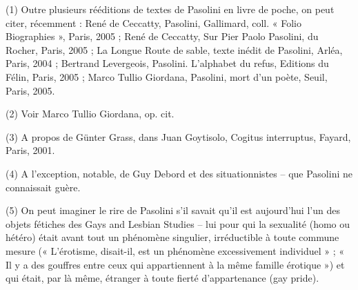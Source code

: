 \documentclass[a4paper,twocolumn]{article}
\begin{document}
(1) Outre plusieurs rééditions de textes de Pasolini en livre de poche, on peut citer, récemment : René de Ceccatty, Pasolini, Gallimard, coll. « Folio Biographies », Paris, 2005 ; René de Ceccatty, Sur Pier Paolo Pasolini, du Rocher, Paris, 2005 ; La Longue Route de sable, texte inédit de Pasolini, Arléa, Paris, 2004 ; Bertrand Levergeois, Pasolini. L’alphabet du refus, Editions du Félin, Paris, 2005 ; Marco Tullio Giordana, Pasolini, mort d’un poète, Seuil, Paris, 2005.

(2) Voir Marco Tullio Giordana, op. cit.

(3) A propos de Günter Grass, dans Juan Goytisolo, Cogitus interruptus, Fayard, Paris, 2001.

(4) A l’exception, notable, de Guy Debord et des situationnistes – que Pasolini ne connaissait guère.

(5) On peut imaginer le rire de Pasolini s’il savait qu’il est aujourd’hui l’un des objets fétiches des Gays and Lesbian Studies – lui pour qui la sexualité (homo ou hétéro) était avant tout un phénomène singulier, irréductible à toute commune mesure (« L’érotisme, disait-il, est un phénomène excessivement individuel » ; « Il y a des gouffres entre ceux qui appartiennent à la même famille érotique ») et qui était, par là même, étranger à toute fierté d’appartenance (gay pride).
\end{document}
